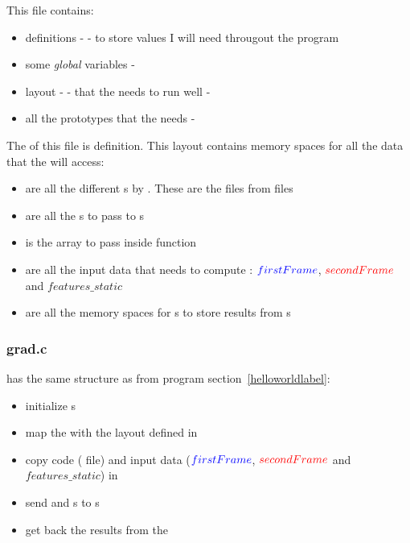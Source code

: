 This file contains:
\begin{itemize}
	\item {} definitions -  - to store values I will need througout the program
	\item some \emph{global} variables - 
	\item \ram{} layout -  - that the  needs to run well - 
	\item all the  prototypes that the \api{} needs - 
\end{itemize}

The  of this file is  definition. This layout contains \ram{} memory spaces for all the data that the \vc{} will access:
\begin{itemize}
	\item {} are all the different s by \vc{}. These are the  files from  files
	\item {} are all the \uni{}s to pass to \qpu{}s
	\item {} is the  array to pass inside  function
	\item {} are all the input data that \vc{} needs to compute \flow: $\textcolor{blue}{firstFrame}$, $\textcolor{red}{secondFrame}$ and $features\_static$
	\item {} are all the \ram{} memory spaces for \qpu{}s to store results from s
\end{itemize}


\subsubsection{grad.c}\label{gradClbl}

 has the same structure as  from  program section~\ref{helloworldlabel}:
\begin{itemize}
	\item initialize \qpu{}s
	\item map the \ram{} with the layout defined in 
	\item copy code ( file) and input data ($\textcolor{blue}{firstFrame}$, $\textcolor{red}{secondFrame}$ and $features\_static$) in \ram
	\item send   and \uni{}s to \qpu{}s
	\item get back the results from the \ram
\end{itemize}

